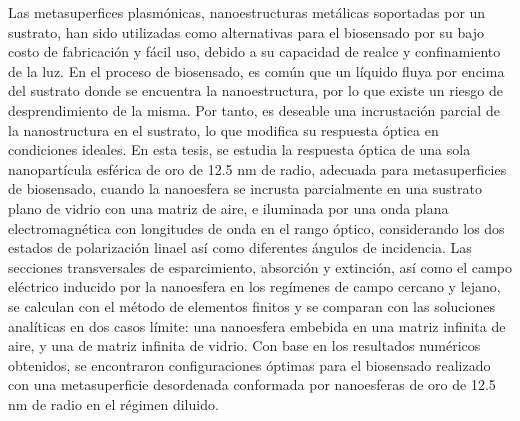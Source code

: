 \begin{abstracts}
Las metasuperfices plasmónicas, nanoestructuras metálicas soportadas por un sustrato, han sido utilizadas como alternativas para el biosensado por su bajo costo de fabricación y fácil uso, debido a su capacidad de realce y confinamiento de la luz. En el proceso de biosensado, es común que un líquido fluya por encima del sustrato donde se encuentra la nanoestructura, por lo que existe un riesgo de desprendimiento de la misma. Por tanto, es deseable una incrustación parcial de la nanostructura en el sustrato, lo que modifica su respuesta óptica en condiciones ideales. En esta tesis, se estudia la respuesta óptica de una sola nanopartícula esférica de oro de 12.5 nm de radio, adecuada para metasuperficies de biosensado, cuando la nanoesfera se incrusta parcialmente en una sustrato plano de vidrio con una matriz de aire, e iluminada por una onda plana electromagnética con longitudes de onda en el rango óptico, considerando los dos estados de polarización linael así como diferentes ángulos de incidencia. Las secciones transversales de esparcimiento, absorción y extinción, así como el campo eléctrico inducido por la nanoesfera en los regímenes de campo cercano y lejano, se calculan con el método de elementos finitos y se comparan con las soluciones analíticas en dos casos límite: una nanoesfera embebida en una matriz infinita de aire, y una de matriz infinita de vidrio. Con base en los resultados numéricos obtenidos, se encontraron configuraciones óptimas para el biosensado realizado con una metasuperficie desordenada conformada por nanoesferas de oro de 12.5 nm de radio en el régimen diluido.



\end{abstracts}


